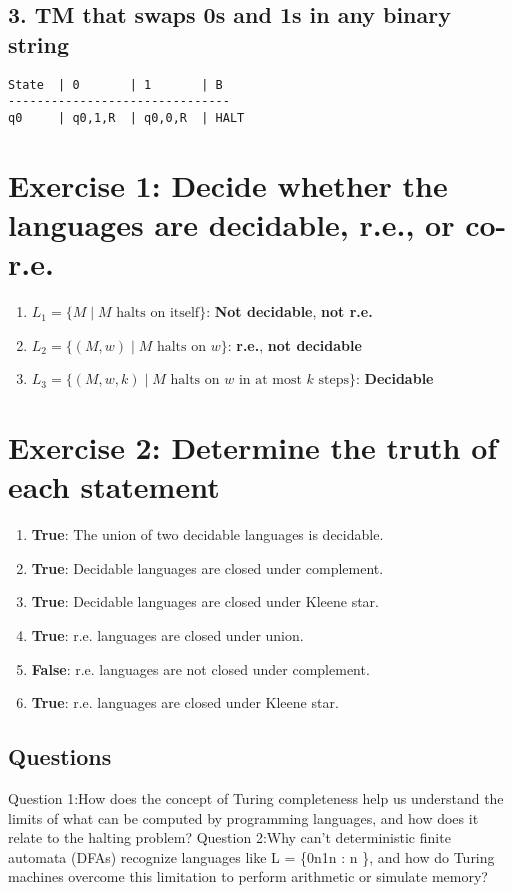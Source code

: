 \documentclass{article}
\begin{document}
\subsection*{3. TM that swaps 0s and 1s in any binary string}

\begin{verbatim}
State  | 0       | 1       | B
-------------------------------
q0     | q0,1,R  | q0,0,R  | HALT
\end{verbatim}

\section*{Exercise 1: Decide whether the languages are decidable, r.e., or co-r.e.}

\begin{enumerate}
    \item \( L_1 = \{M \mid M \text{ halts on itself} \} \): \textbf{Not decidable}, \textbf{not r.e.}
    \item \( L_2 = \{(M, w) \mid M \text{ halts on } w \} \): \textbf{r.e.}, \textbf{not decidable}
    \item \( L_3 = \{(M, w, k) \mid M \text{ halts on } w \text{ in at most } k \text{ steps} \} \): \textbf{Decidable}
\end{enumerate}

\section*{Exercise 2: Determine the truth of each statement}

\begin{enumerate}
    \item \textbf{True}: The union of two decidable languages is decidable.
    \item \textbf{True}: Decidable languages are closed under complement.
    \item \textbf{True}: Decidable languages are closed under Kleene star.
    \item \textbf{True}: r.e. languages are closed under union.
    \item \textbf{False}: r.e. languages are not closed under complement.
    \item \textbf{True}: r.e. languages are closed under Kleene star.
\end{enumerate}

\subsection{Questions}
Question 1:How does the concept of Turing completeness help us understand the limits of what can be computed by programming languages, and how does it relate to the halting problem?
Question 2:Why can’t deterministic finite automata (DFAs) recognize languages like L = \{0n1n : n \in {}\}, and how do Turing machines overcome this limitation to perform arithmetic or simulate memory?
\end{document}
